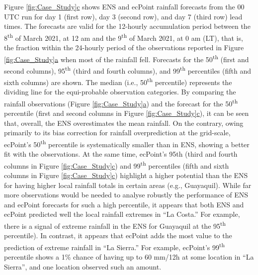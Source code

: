 \documentclass[techmemo]{ecmwfrep}%
\begin{document}
Figure \ref{fig:Case_Study}\hyperref[fig:Case_Study]{c} shows ENS and ecPoint rainfall forecasts from the 00 UTC run for day 1 (first row), day 3 (second row), and day 7 (third row) lead times. The forecasts are valid for the 12-hourly accumulation period between the 8\textsuperscript{th} of March 2021, at 12 am and the 9\textsuperscript{th} of March 2021, at 0 am (LT), that is, the fraction within the 24-hourly period of the observations reported in Figure \ref{fig:Case_Study}\hyperref[fig:Case_Study]{a} when most of the rainfall fell. Forecasts for the 50\textsuperscript{th} (first and second columns), 95\textsuperscript{th} (third and fourth columns), and 99\textsuperscript{th} percentiles (fifth and sixth columns) are shown. The median (i.e., 50\textsuperscript{th} percentile) represents the dividing line for the equi-probable observation categories. By comparing the rainfall observations (Figure \ref{fig:Case_Study}\hyperref[fig:Case_Study]{a}) and the forecast for the 50\textsuperscript{th} percentile (first and second columns in Figure \ref{fig:Case_Study}\hyperref[fig:Case_Study]{c}), it can be seen that, overall, the ENS overestimates the mean rainfall. On the contrary, owing primarily to its bias correction for rainfall overprediction at the grid-scale, ecPoint’s 50\textsuperscript{th} percentile is systematically smaller than in ENS, showing a better fit with the observations. At the same time, ecPoint’s 95th (third and fourth columns in Figure \ref{fig:Case_Study}\hyperref[fig:Case_Study]{c}) and 99\textsuperscript{th} percentiles (fifth and sixth columns in Figure \ref{fig:Case_Study}\hyperref[fig:Case_Study]{c}) highlight a higher potential than the ENS for having higher local rainfall totals in certain areas (e.g., Guayaquil). While far more observations would be needed to analyse robustly the performance of ENS and ecPoint forecasts for such a high percentile, it appears that both ENS and ecPoint predicted well the local rainfall extremes in “La Costa.” For example, there is a signal of extreme rainfall in the ENS for Guayaquil at the 95\textsuperscript{th} percentile). In contrast, it appears that ecPoint adds the most value to the prediction of extreme rainfall in “La Sierra.” For example, ecPoint’s 99\textsuperscript{th} percentile shows a 1\% chance of having up to 60 mm/12h at some location in “La Sierra”, and one location observed such an amount.
\end{document}
